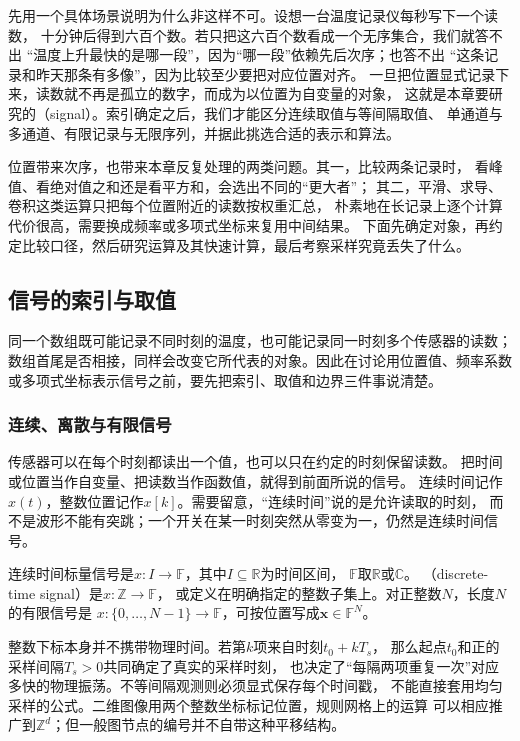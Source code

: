 先用一个具体场景说明为什么非这样不可。设想一台温度记录仪每秒写下一个读数，
十分钟后得到六百个数。若只把这六百个数看成一个无序集合，我们就答不出
“温度上升最快的是哪一段”，因为“哪一段”依赖先后次序；也答不出
“这条记录和昨天那条有多像”，因为比较至少要把对应位置对齐。
一旦把位置显式记录下来，读数就不再是孤立的数字，而成为以位置为自变量的对象，
这就是本章要研究的（signal）。索引确定之后，我们才能区分连续取值与等间隔取值、
单通道与多通道、有限记录与无限序列，并据此挑选合适的表示和算法。

位置带来次序，也带来本章反复处理的两类问题。其一，比较两条记录时，
看峰值、看绝对值之和还是看平方和，会选出不同的“更大者”；
其二，平滑、求导、卷积这类运算只把每个位置附近的读数按权重汇总，
朴素地在长记录上逐个计算代价很高，需要换成频率或多项式坐标来复用中间结果。
下面先确定对象，再约定比较口径，然后研究运算及其快速计算，最后考察采样究竟丢失了什么。

\subsection{信号的索引与取值}

同一个数组既可能记录不同时刻的温度，也可能记录同一时刻多个传感器的读数；
数组首尾是否相接，同样会改变它所代表的对象。因此在讨论用位置值、频率系数
或多项式坐标表示信号之前，要先把索引、取值和边界三件事说清楚。

\subsubsection{连续、离散与有限信号}

传感器可以在每个时刻都读出一个值，也可以只在约定的时刻保留读数。
把时间或位置当作自变量、把读数当作函数值，就得到前面所说的信号。
连续时间记作$x(t)$，整数位置记作$x[k]$。需要留意，“连续时间”说的是允许读取的时刻，
而不是波形不能有突跳；一个开关在某一时刻突然从零变为一，仍然是连续时间信号。

\begin{definition}[信号的索引类型]
  \label{def:signal-index-types}
  连续时间标量信号是$x:I\to\mathbb F$，其中$I\subseteq\mathbb R$为时间区间，
  $\mathbb F$取$\mathbb R$或$\mathbb C$。
  （discrete-time signal）是$x:\mathbb Z\to\mathbb F$，
  或定义在明确指定的整数子集上。对正整数$N$，长度$N$的有限信号是
  $x:\{0,\ldots,N-1\}\to\mathbb F$，可按位置写成$\bm x\in\mathbb F^N$。
\end{definition}

整数下标本身并不携带物理时间。若第$k$项来自时刻$t_0+kT_s$，
那么起点$t_0$和正的采样间隔$T_s>0$共同确定了真实的采样时刻，
也决定了“每隔两项重复一次”对应多快的物理振荡。不等间隔观测则必须显式保存每个时间戳，
不能直接套用均匀采样的公式。二维图像用两个整数坐标标记位置，规则网格上的运算
可以相应推广到$\mathbb Z^d$；但一般图节点的编号并不自带这种平移结构。

